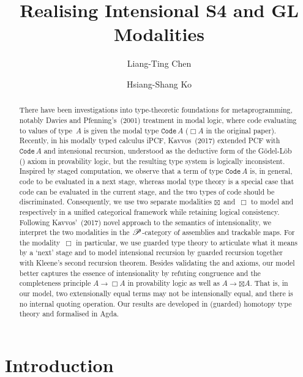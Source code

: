 \documentclass[a4paper,UKenglish,numberwithinsect,cleveref,thm-restate]{lipics-v2021}
\title{Realising Intensional S4 and GL Modalities}
\author{Liang-Ting Chen}%
  {Institute of Information Science, Academia Sinica, Taiwan~\url{https://l-tchen.github.io}}%
  {liang.ting.chen.tw@gmail.com}%
  {https://orcid.org/0000-0002-3250-1331}{}
\author{Hsiang-Shang Ko}%
  {Institute of Information Science, Academia Sinica, Taiwan~\url{https://josh-hs-ko.github.io}}%
  {joshko@iis.sinica.edu.tw}%
  {https://orcid.org/0000-0002-2439-1048}{}
\numberwithin{equation}{section}
\theoremstyle{definition}
\theoremstyle{plain}
\begin{document}
\maketitle

\begin{abstract}

There have been investigations into type-theoretic foundations for metaprogramming, notably Davies and Pfenning's~(2001) treatment in \SFour modal logic, where code evaluating to values of type~$A$ is given the modal type $\mathtt{Code}\,A$ ($\Box A$ in the original paper).
Recently, in his modally typed calculus iPCF, Kavvos~(2017) extended PCF with $\mathtt{Code}\,A$ and intensional recursion, understood as the deductive form of the Gödel-Löb (\GL) axiom in provability logic, but the resulting type system is logically inconsistent.
Inspired by staged computation, we observe that a term of type $\mathtt{Code}\,A$ is, in general, code to be evaluated in a next stage, whereas \SFour modal type theory is a special case that code can be evaluated in the current stage, and the two types of code should be discriminated.
Consequently, we use two separate modalities $\boxtimes$~and~$\Box$ to model \SFour and \GL respectively in a unified categorical framework while retaining logical consistency.
Following Kavvos'~(2017) novel approach to the semantics of intensionality, we interpret the two modalities in the $\mathscr{P}$-category of assemblies and trackable maps.
For the \GL modality~$\Box$ in particular, we use guarded type theory to articulate what it means by a `next' stage and to model intensional recursion by guarded recursion together with Kleene's second recursion theorem.
Besides validating the \SFour and \GL axioms, our model better captures the essence of intensionality by refuting congruence and the completeness principle $A \to \Box A$ in provability logic as well as $A \to \boxtimes A$.
That is, in our model, two extensionally equal terms may not be intensionally equal, and there is no internal quoting operation.
Our results are developed in (guarded) homotopy type theory and formalised in Agda.
\end{abstract}

\section{Introduction}\label{sec:intro}
\end{document}

